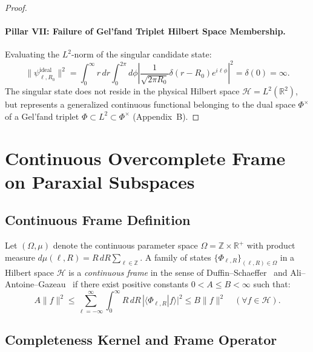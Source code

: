 \documentclass[11pt,a4paper]{article}
\begin{document}
\begin{proof}
\paragraph{Pillar VII: Failure of Gel'fand Triplet Hilbert Space Membership.}
Evaluating the $L^2$-norm of the singular candidate state:
\begin{equation}
\|\psi_{\ell, R_0}^{\text{ideal}}\|^2 = \int_0^\infty r \, dr \int_0^{2\pi} d\phi \left| \frac{1}{\sqrt{2\pi R_0}} \delta(r - R_0) e^{i \ell \phi} \right|^2 = \delta(0) = \infty.
\end{equation}
The singular state does not reside in the physical Hilbert space $\mathcal{H} = L^2(\mathbb{R}^2)$, but represents a generalized continuous functional belonging to the dual space $\Phi^\times$ of a Gel'fand triplet $\Phi \subset L^2 \subset \Phi^\times$ (Appendix~B).
\end{proof}

\section{Continuous Overcomplete Frame on Paraxial Subspaces}
\label{sec:frame_theory}

\subsection{Continuous Frame Definition}

Let $(\Omega, \mu)$ denote the continuous parameter space $\Omega = \mathbb{Z} \times \mathbb{R}^+$ with product measure $d\mu(\ell, R) = R \, dR \sum_{\ell \in \mathbb{Z}}$. A family of states $\{\Phi_{\ell, R}\}_{(\ell, R) \in \Omega}$ in a Hilbert space $\mathcal{H}$ is a \emph{continuous frame} in the sense of Duffin--Schaeffer~\cite{Duffin1952} and Ali--Antoine--Gazeau~\cite{Ali1993} if there exist positive constants $0 < A \le B < \infty$ such that:
\begin{equation}
A \|f\|^2 \le \sum_{\ell=-\infty}^\infty \int_0^\infty R \, dR \, |\langle \Phi_{\ell, R} | f \rangle|^2 \le B \|f\|^2 \quad (\forall f \in \mathcal{H}).
\label{eq:frame_def}
\end{equation}

\subsection{Completeness Kernel and Frame Operator}
\end{document}
